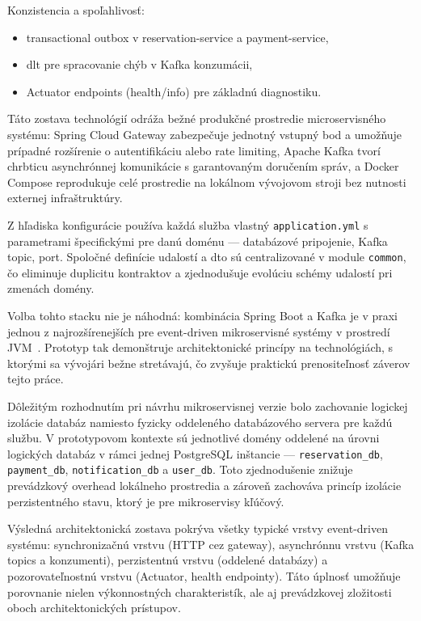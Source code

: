 Konzistencia a spoľahlivosť:
\begin{itemize}
    \item transactional outbox v reservation-service a payment-service,
    \item \acrshort{dlt} pre spracovanie chýb v Kafka konzumácii,
    \item Actuator endpoints (health/info) pre základnú diagnostiku.
\end{itemize}

Táto zostava technológií odráža bežné produkčné prostredie microservisného systému: Spring Cloud Gateway zabezpečuje jednotný vstupný bod a umožňuje prípadné rozšírenie o autentifikáciu alebo rate limiting, Apache Kafka tvorí chrbticu asynchrónnej komunikácie s garantovaným doručením správ, a Docker Compose reprodukuje celé prostredie na lokálnom vývojovom stroji bez nutnosti externej infraštruktúry.

Z hľadiska konfigurácie používa každá služba vlastný \texttt{application.yml} s parametrami špecifickými pre danú doménu — databázové pripojenie, Kafka topic, port. Spoločné definície udalostí a \acrshort{dto} sú centralizované v module \texttt{common}, čo eliminuje duplicitu kontraktov a zjednodušuje evolúciu schémy udalostí pri zmenách domény.

Volba tohto stacku nie je náhodná: kombinácia Spring Boot a Kafka je v praxi jednou z najrozšírenejších pre event-driven mikroservisné systémy v prostredí JVM~\cite{Newman2021}. Prototyp tak demonštruje architektonické princípy na technológiách, s ktorými sa vývojári bežne stretávajú, čo zvyšuje praktickú prenositeľnosť záverov tejto práce.

Dôležitým rozhodnutím pri návrhu mikroservisnej verzie bolo zachovanie logickej izolácie databáz namiesto fyzicky oddeleného databázového servera pre každú službu. V prototypovom kontexte sú jednotlivé domény oddelené na úrovni logických databáz v rámci jednej PostgreSQL inštancie — \texttt{reservation\_db}, \texttt{payment\_db}, \texttt{notification\_db} a \texttt{user\_db}. Toto zjednodušenie znižuje prevádzkový overhead lokálneho prostredia a zároveň zachováva princíp izolácie perzistentného stavu, ktorý je pre mikroservisy kľúčový.

Výsledná architektonická zostava pokrýva všetky typické vrstvy event-driven systému: synchronizačnú vrstvu (HTTP cez gateway), asynchrónnu vrstvu (Kafka topics a konzumenti), perzistentnú vrstvu (oddelené databázy) a pozorovateľnostnú vrstvu (Actuator, health endpointy). Táto úplnosť umožňuje porovnanie nielen výkonnostných charakteristík, ale aj prevádzkovej zložitosti oboch architektonických prístupov.

